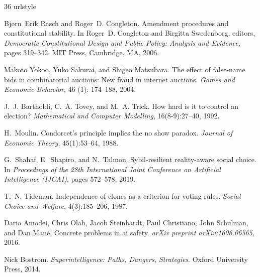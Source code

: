 \documentclass[12pt]{article}
\begin{document}
\clearpage
\begin{thebibliography}{36}
\providecommand{\natexlab}[1]{#1}
\providecommand{\url}[1]{\texttt{#1}}
\expandafter\ifx\csname urlstyle\endcsname\relax
  \providecommand{\doi}[1]{doi: #1}\else
  \providecommand{\doi}{doi: \begingroup \urlstyle{rm}\Url}\fi

Bj{\o}rn~Erik Rasch and Roger~D. Congleton.
\newblock Amendment procedures and constitutional stability.
\newblock In Roger~D. Congleton and Birgitta Swedenborg, editors, \emph{Democratic
  Constitutional Design and Public Policy: Analysis and Evidence}, pages
  319--342. MIT Press, Cambridge, MA, 2006.

Makoto Yokoo, Yuko Sakurai, and Shigeo Matsubara.
\newblock The effect of false-name bids in combinatorial auctions: New fraud in
  internet auctions.
\newblock \emph{Games and Economic Behavior}, 46 (1):
  174--188, 2004.

J.~J. Bartholdi, C.~A. Tovey, and M.~A. Trick.
\newblock How hard is it to control an election?
\newblock \emph{Mathematical and Computer Modelling}, 16(8-9):27--40, 1992.

H.~Moulin.
\newblock Condorcet's principle implies the no show paradox.
\newblock \emph{Journal of Economic Theory}, 45(1):53--64, 1988.

G.~Shahaf, E.~Shapiro, and N.~Talmon.
\newblock Sybil-resilient reality-aware social choice.
\newblock In \emph{Proceedings of the 28th International Joint Conference on
  Artificial Intelligence (IJCAI)}, pages 572--578, 2019.

T.~N. Tideman.
\newblock Independence of clones as a criterion for voting rules.
\newblock \emph{Social Choice and Welfare}, 4(3):185--206, 1987.

Dario Amodei, Chris Olah, Jacob Steinhardt, Paul Christiano, John Schulman, and
  Dan Man{\'e}.
\newblock Concrete problems in ai safety.
\newblock \emph{arXiv preprint arXiv:1606.06565}, 2016.

Nick Bostrom.
\newblock \emph{Superintelligence: Paths, Dangers, Strategies}.
\newblock Oxford University Press, 2014.


\end{thebibliography}
\end{document}
